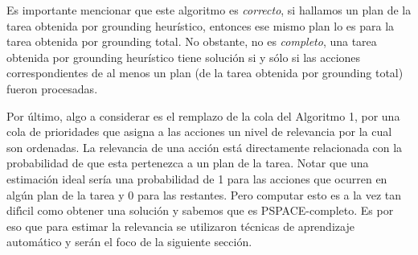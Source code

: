 Es importante mencionar que este algoritmo es \emph{correcto}, si hallamos un
plan de la tarea obtenida por grounding heurístico, entonces ese mismo plan lo
es para la tarea obtenida por grounding total. No obstante, no es
\emph{completo}, una tarea obtenida por grounding heurístico tiene solución si y
sólo si las acciones correspondientes de al menos un plan (de la tarea obtenida
por grounding total) fueron procesadas.

Por último, algo a considerar es el remplazo de la cola del Algoritmo 1, por una
cola de prioridades que asigna a las acciones un nivel de relevancia por la cual
son ordenadas. La relevancia de una acción está directamente relacionada con la
probabilidad de que esta pertenezca a un plan de la tarea. Notar que una
estimación ideal sería una probabilidad de 1 para las acciones que ocurren en
algún plan de la tarea y 0 para las restantes. Pero computar esto es a la vez
tan difı́cil como obtener una solución y sabemos que es PSPACE-completo. Es por
eso que para estimar la relevancia se utilizaron técnicas de aprendizaje
automático y serán el foco de la siguiente sección.
